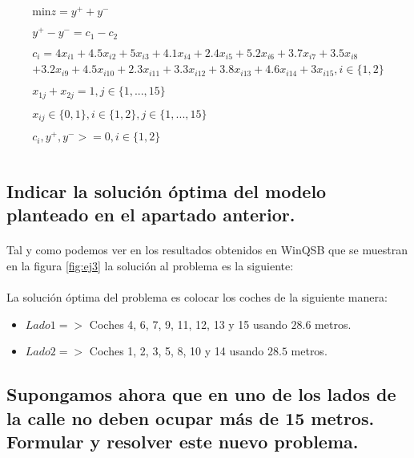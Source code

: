 \documentclass[10pt, a4paper]{article}
\begin{document}
			\[
				\begin{split}
					\text{min} z = y^{+} + y^{-} \\ \\
						y^{+} - y^{-} = c_1 - c_2 \\ \\
						c_i = 4x_{i1} + 4.5x_{i2} + 5x_{i3} + 4.1x_{i4} + 2.4x_{i5} + 5.2x_{i6} + 3.7x_{i7} + 3.5x_{i8} \\
						+ 3.2x_{i9} + 4.5x_{i10} + 2.3x_{i11} + 3.3x_{i12} + 3.8x_{i13} + 4.6x_{i14} + 3x_{i15}, i \in \{1,2\}\\ \\
						x_{1j} + x_{2j} = 1, j \in \{1,...,15\} \\ \\
						x_{ij} \in \{0,1\}, i \in \{1,2\},j \in \{1,...,15\} \\ \\
						c_{i}, y^{+}, y^{-} >= 0, i \in \{1,2\}\\ \\
				\end{split}
			\]
		\subsection{Indicar la solución óptima del modelo planteado en el apartado anterior.}

			\paragraph{}
			Tal y como podemos ver en los resultados obtenidos en WinQSB que se muestran en la figura \ref{fig:ej3} la solución al problema es la siguiente:

			\paragraph{}
			La solución óptima del problema es colocar los coches de la siguiente manera:


			\begin{itemize}
				\item \(Lado 1 => \) Coches 4, 6, 7, 9, 11, 12, 13 y 15 usando $28.6$ metros.

				\item \(Lado 2 => \) Coches 1, 2, 3, 5, 8, 10 y 14 usando $28.5$ metros.
			\end{itemize}


		\subsection{Supongamos ahora que en uno de los lados de la calle no deben ocupar más de 15 metros. Formular y resolver este nuevo problema.}
\end{document}
